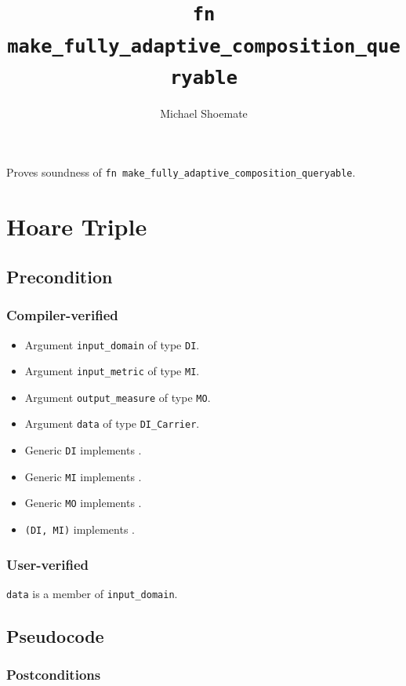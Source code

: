 \documentclass{article}
\title{\texttt{fn make\_fully\_adaptive\_composition\_queryable}}
\author{Michael Shoemate}
\date{}
\begin{document}
\maketitle

\contrib
Proves soundness of \texttt{fn make\_fully\_adaptive\_composition\_queryable}.

\section{Hoare Triple}
\subsection*{Precondition}
\subsubsection*{Compiler-verified}
\begin{itemize}
    \item Argument \texttt{input\_domain} of type \texttt{DI}.
    \item Argument \texttt{input\_metric} of type \texttt{MI}.
    \item Argument \texttt{output\_measure} of type \texttt{MO}.
    \item Argument \texttt{data} of type \texttt{DI\_Carrier}.
    \item Generic \texttt{DI} implements .
    \item Generic \texttt{MI} implements .
    \item Generic \texttt{MO} implements .
    \item \texttt{(DI, MI)} implements .
\end{itemize}
\subsubsection*{User-verified}
\texttt{data} is a member of \texttt{input\_domain}.

\subsection*{Pseudocode}


\subsubsection*{Postconditions}
\end{document}
